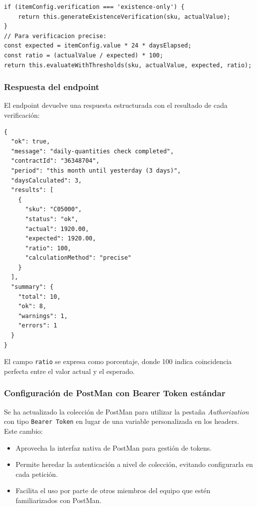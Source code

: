 \begin{lstlisting}[caption=Lógica de verificación por tipo, label=lst:process-verification]
if (itemConfig.verification === 'existence-only') {
    return this.generateExistenceVerification(sku, actualValue);
}
// Para verificacion precise:
const expected = itemConfig.value * 24 * daysElapsed;
const ratio = (actualValue / expected) * 100;
return this.evaluateWithThresholds(sku, actualValue, expected, ratio);
\end{lstlisting}

\subsubsection{Respuesta del endpoint}
El endpoint devuelve una respuesta estructurada con el resultado de cada verificación:

\begin{lstlisting}[caption=Ejemplo de respuesta del endpoint de cantidades diarias, label=lst:response-daily]
{
  "ok": true,
  "message": "daily-quantities check completed",
  "contractId": "36348704",
  "period": "this month until yesterday (3 days)",
  "daysCalculated": 3,
  "results": [
    {
      "sku": "C05000",
      "status": "ok",
      "actual": 1920.00,
      "expected": 1920.00,
      "ratio": 100,
      "calculationMethod": "precise"
    }
  ],
  "summary": {
    "total": 10,
    "ok": 8,
    "warnings": 1,
    "errors": 1
  }
}
\end{lstlisting}

El campo \texttt{ratio} se expresa como porcentaje, donde 100 indica coincidencia perfecta entre el valor actual y el esperado.

\subsubsection{Configuración de PostMan con Bearer Token estándar}
Se ha actualizado la colección de PostMan para utilizar la pestaña \textit{Authorization} con tipo \texttt{Bearer Token} en lugar de una variable personalizada en los headers. Este cambio:

\begin{itemize}
    \item Aprovecha la interfaz nativa de PostMan para gestión de tokens.
    \item Permite heredar la autenticación a nivel de colección, evitando configurarla en cada petición.
    \item Facilita el uso por parte de otros miembros del equipo que estén familiarizados con PostMan.
\end{itemize}

